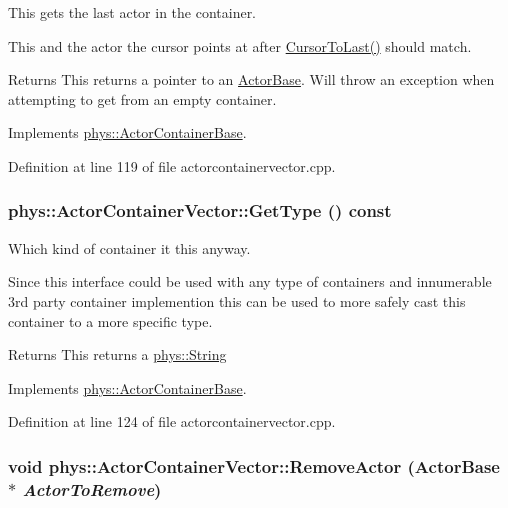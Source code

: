 This gets the last actor in the container. 

This and the actor the cursor points at after \hyperlink{classphys_1_1ActorContainerVector_aa6b08266bbb57a22c07ab50514e58db4}{CursorToLast()} should match. \begin{DoxyReturn}{Returns}
This returns a pointer to an \hyperlink{classphys_1_1ActorBase}{ActorBase}. Will throw an exception when attempting to get from an empty container. 
\end{DoxyReturn}


Implements \hyperlink{classphys_1_1ActorContainerBase_a8efeffd5ae22085fe01af791b3ea559e}{phys::ActorContainerBase}.



Definition at line 119 of file actorcontainervector.cpp.

\hypertarget{classphys_1_1ActorContainerVector_a20d18213e69b3821ee973865df428e6d}{
\subsubsection[{GetType}]{ phys::ActorContainerVector::GetType () const}}
\label{d3/d64/classphys_1_1ActorContainerVector_a20d18213e69b3821ee973865df428e6d}


Which kind of container it this anyway. 

Since this interface could be used with any type of containers and innumerable 3rd party container implemention this can be used to more safely cast this container to a more specific type. \begin{DoxyReturn}{Returns}
This returns a \hyperlink{namespacephys_aa03900411993de7fbfec4789bc1d392e}{phys::String} 
\end{DoxyReturn}


Implements \hyperlink{classphys_1_1ActorContainerBase_a526dab176597858680490d128d0584a3}{phys::ActorContainerBase}.



Definition at line 124 of file actorcontainervector.cpp.

\hypertarget{classphys_1_1ActorContainerVector_aeee5bd81601faed85e6a35f576c8d476}{
\subsubsection[{RemoveActor}]{\setlength{\rightskip}{0pt plus 5cm}void phys::ActorContainerVector::RemoveActor ({\bf ActorBase} $\ast$ {\em ActorToRemove})}}
\label{d3/d64/classphys_1_1ActorContainerVector_aeee5bd81601faed85e6a35f576c8d476}


